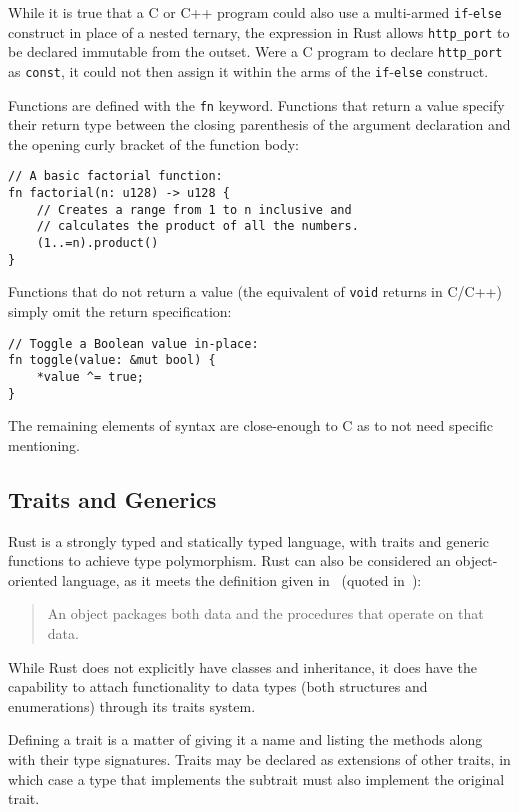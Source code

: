 While it is true that a C or C++ program could also use a multi-armed \texttt{if}-\texttt{else} construct in place of a nested ternary, the expression in Rust allows \texttt{http\_port} to be declared immutable from the outset. Were a C program to declare \texttt{http\_port} as \texttt{const}, it could not then assign it within the arms of the \texttt{if}-\texttt{else} construct.

Functions are defined with the \texttt{fn} keyword. Functions that return a value specify their return type between the closing parenthesis of the argument declaration and the opening curly bracket of the function body:

\begin{lstlisting}
// A basic factorial function:
fn factorial(n: u128) -> u128 {
    // Creates a range from 1 to n inclusive and
    // calculates the product of all the numbers.
    (1..=n).product()
}
\end{lstlisting}

Functions that do not return a value (the equivalent of \texttt{void} returns in C/C++) simply omit the return specification:

\begin{lstlisting}
// Toggle a Boolean value in-place:
fn toggle(value: &mut bool) {
    *value ^= true;
}
\end{lstlisting}

The remaining elements of syntax are close-enough to C as to not need specific mentioning.

\subsection{Traits and Generics}

Rust is a strongly typed and statically typed language, with traits and generic functions to achieve type polymorphism. Rust can also be considered an object-oriented language, as it meets the definition given in~\cite{design.patterns.1994} (quoted in~\cite[Chapter~17]{rpl.2019}):

\begin{quote}
An object packages both data and the procedures that operate on that data.
\end{quote}

While Rust does not explicitly have classes and inheritance, it does have the capability to attach functionality to data types (both structures and enumerations) through its traits system.

Defining a trait is a matter of giving it a name and listing the methods along with their type signatures. Traits may be declared as extensions of other traits, in which case a type that implements the subtrait must also implement the original trait.

